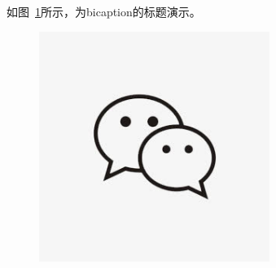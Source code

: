 \documentclass{thesis_demo}
\begin{document}
	\listoffigures
	\newpage
	
	如图~\ref{fig:wechat}所示，为bicaption的标题演示。
	\begin{figure}[!htbp]
		\centering
		\includegraphics[width=7.5cm]{wechat.jpg}
		\label{fig:wechat}
	\end{figure} 
\end{document}
